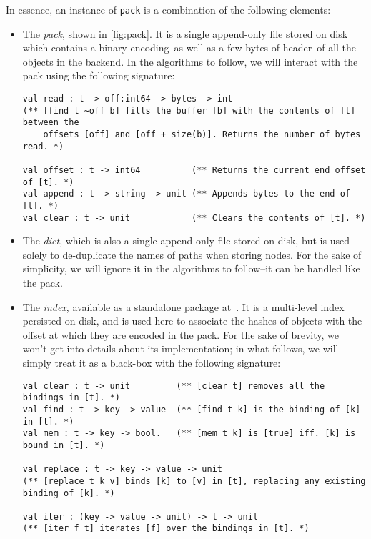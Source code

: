 \bigskip
In essence, an instance of \texttt{pack} is a combination of the following elements:
\begin{itemize}
  \item
        The \emph{pack}, shown in \cref{fig:pack}. It is a single append-only file stored on disk which contains a binary encoding--as well as a few bytes of header--of all the objects in the backend. In the algorithms to follow, we will interact with the pack using the following signature:

        \begin{verbatim}
val read : t -> off:int64 -> bytes -> int
(** [find t ~off b] fills the buffer [b] with the contents of [t] between the
    offsets [off] and [off + size(b)]. Returns the number of bytes read. *)

val offset : t -> int64          (** Returns the current end offset of [t]. *)
val append : t -> string -> unit (** Appends bytes to the end of [t]. *)
val clear : t -> unit            (** Clears the contents of [t]. *)
  \end{verbatim}
        \vspace{-1em}

  \item
        The \emph{dict}, which is also a single append-only file stored on disk, but is used solely to de-duplicate the names of paths when storing nodes. For the sake of simplicity, we will ignore it in the algorithms to follow--it can be handled like the pack.

  \item
        The \emph{index}, available as a standalone package at~\cite{index-github}. It is a multi-level index persisted on disk, and is used here to associate the hashes of objects with the offset at which they are encoded in the pack. For the sake of brevity, we won't get into details about its implementation; in what follows, we will simply treat it as a black-box with the following signature:

        \begin{verbatim}
val clear : t -> unit         (** [clear t] removes all the bindings in [t]. *)
val find : t -> key -> value  (** [find t k] is the binding of [k] in [t]. *)
val mem : t -> key -> bool.   (** [mem t k] is [true] iff. [k] is bound in [t]. *)

val replace : t -> key -> value -> unit
(** [replace t k v] binds [k] to [v] in [t], replacing any existing binding of [k]. *)

val iter : (key -> value -> unit) -> t -> unit
(** [iter f t] iterates [f] over the bindings in [t]. *)
  \end{verbatim}
\end{itemize}

